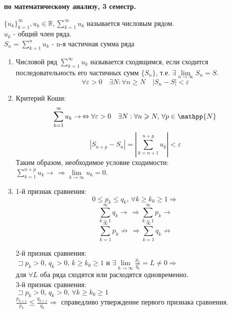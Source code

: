 \documentclass[oneside,final,12pt]{extreport}
\begin{document}
\centerline{\bf{} по математическому анализу, 3 семестр.}
\noindent\( \{ u_k \}_{k = 1}^\infty, u_k \in \mathbb {R}, \sum\limits_{k=1}^\infty u_k \) называется числовым рядом. \\
\( u_k \) - общий член ряда. \\
\( S_n  = \sum\limits_{k=1}^n u_k \) - n-я частичная сумма ряда \\ 
\begin{enumerate}
    \item Числовой ряд \( \sum\limits_{k=1}^\infty u_k\) называется сходящимся, если сходится последовательность его частичных сумм \( \{ S_n \} \), т.е. \( \exists \lim\limits_{n \to \infty} S_n = S \).
    \[ \forall \varepsilon > 0 \quad \exists N: \forall n \geqslant N \quad | S_n - S | < \varepsilon \]
    
    \item Критерий Коши:
    \[ \sum\limits_{k=1}^\infty u_k \rightarrow \, \Leftrightarrow \forall \varepsilon > 0 \quad \exists N: \forall n \geqslant N, \, \forall p \in \mathpp {N} \]
    \[ | S_{n + p} - S_n | = | \sum\limits_{k=n+1}^{n+p}u_k | < \varepsilon \]
    Таким образом, необходимое условие сходимости: \( \sum\limits_{k=1}^{n+p}u_k \rightarrow \, \Rightarrow \lim\limits_{k \to \infty} u_k = 0 \).
    
    \item 1-й признак сравнения:
    \[ 0 \leqslant p_k \leqslant q_k, \, \forall k \geqslant k_0 \geqslant 1 \Rightarrow \]
    \[ \sum\limits_{k=1}^\infty q_k \rightarrow \, \Rightarrow \sum\limits_{k=1}^\infty p_k \rightarrow\]
    \[ \sum\limits_{k=1}^\infty p_k \not\rightarrow \, \Rightarrow \sum\limits_{k=1}^\infty q_k \not\rightarrow\]

    2-й признак сравнения: \\
    \( \sqsupset p_k > 0, \, q_k > 0, \, k \geqslant k_0 \geqslant 1 \) и \( \exists \lim\limits_{k\to\infty}\frac{p_k}{q_k}=L \ne 0 \Rightarrow \) \\ для \( \forall L \) оба ряда сходятся или расходятся одновременно. \\
    
    3-й признак сравнения: \\
    \( \sqsupset p_k > 0, \, q_k >0, \,\forall k \geqslant k_0 \geqslant 1 \) \\
    \( \frac{p_{k+1}}{p_k} \leqslant \frac{q_{k+1}}{q_k} \Rightarrow \) справедливо утверждение первого признака сравнения. \\
    

\end{enumerate}
\end{document}
